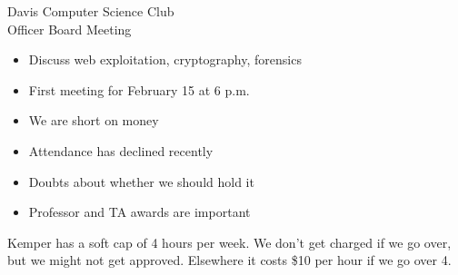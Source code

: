 \documentclass{article}
\begin{document}
\begin{Minutes}{Davis Computer Science Club\\Officer Board Meeting}
\begin{itemize}
\item Discuss web exploitation, cryptography, forensics
\item First meeting for February 15 at 6 p.m.
\end{itemize}
\begin{itemize}
\item We are short on money
\item Attendance has declined recently
\item Doubts about whether we should hold it
\item Professor and TA awards are important
\end{itemize}
Kemper has a soft cap of 4 hours per week.  We don't get charged if we go over,
but we might not get approved.  Elsewhere it costs \$10 per hour if we go over 4.
\thispagestyle{creditfooter}
\end{Minutes}
\end{document}
